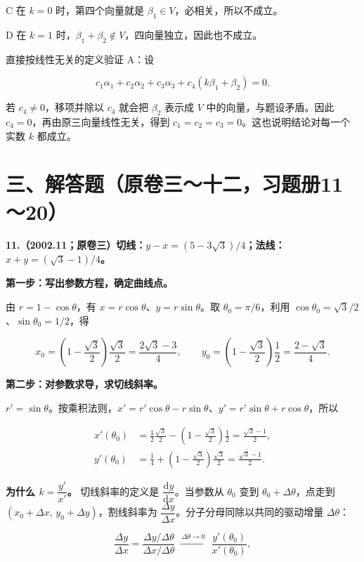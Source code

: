 \documentclass[UTF8,11pt,fontset=windows]{ctexart}
\begin{document}
C 在 $k=0$ 时，第四个向量就是 $\beta_1\in V$，必相关，所以不成立。

D 在 $k=1$ 时，$\beta_1+\beta_2\notin V$，四向量独立，因此也不成立。

直接按线性无关的定义验证 A：设

$$
c_1\alpha_1+c_2\alpha_2+c_3\alpha_3+c_4(k\beta_1+\beta_2)=0.
$$

若 $c_4\ne0$，移项并除以 $c_4$ 就会把 $\beta_2$ 表示成 $V$ 中的向量，与题设矛盾。因此 $c_4=0$，再由原三向量线性无关，得到 $c_1=c_2=c_3=0$。这也说明结论对每一个实数 $k$ 都成立。

\clearpage

\section*{三、解答题（原卷三～十二，习题册11～20）}

\textbf{11.（2002.11；原卷三）切线：$y-x=(5-3\sqrt3)/4$；法线：$x+y=(\sqrt3-1)/4$。}

\textbf{第一步：写出参数方程，确定曲线点。}

由 $r=1-\cos\theta$，有 $x=r\cos\theta$、$y=r\sin\theta$。取 $\theta_0=\pi/6$，利用 $\cos\theta_0=\sqrt3/2$、$\sin\theta_0=1/2$，得

$$
x_0=\left(1-\frac{\sqrt3}{2}\right)\frac{\sqrt3}{2}
=\frac{2\sqrt3-3}{4},
\qquad
y_0=\left(1-\frac{\sqrt3}{2}\right)\frac12
=\frac{2-\sqrt3}{4}.
$$

\textbf{第二步：对参数求导，求切线斜率。}

$r'=\sin\theta$。按乘积法则，$x'=r'\cos\theta-r\sin\theta$、$y'=r'\sin\theta+r\cos\theta$，所以

$$
\begin{aligned}
x'(\theta_0)&=\frac12\frac{\sqrt3}{2}-\left(1-\frac{\sqrt3}{2}\right)\frac12
=\frac{\sqrt3-1}{2},\\
y'(\theta_0)&=\frac14+\left(1-\frac{\sqrt3}{2}\right)\frac{\sqrt3}{2}
=\frac{\sqrt3-1}{2}.
\end{aligned}
$$

\textbf{为什么 $k=\dfrac{y'}{x'}$。} 切线斜率的定义是 $\dfrac{\mathrm dy}{\mathrm dx}$。当参数从 $\theta_0$ 变到 $\theta_0+\Delta\theta$，点走到 $(x_0+\Delta x,\,y_0+\Delta y)$，割线斜率为 $\dfrac{\Delta y}{\Delta x}$。分子分母同除以共同的驱动增量 $\Delta\theta$：

$$
\frac{\Delta y}{\Delta x}
=\frac{\Delta y/\Delta\theta}{\Delta x/\Delta\theta}
\ \xrightarrow{\ \Delta\theta\to0\ }\
\frac{y'(\theta_0)}{x'(\theta_0)},
$$
\end{document}
